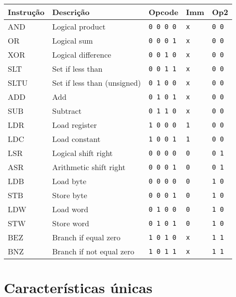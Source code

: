 \documentclass{extreport}
\begin{document}
\begin{table}[ht!]
\centering
\begin{tabular}{|p{2.0cm}|p{5.6cm}|p{1.6cm}|p{1.6cm}|p{1.6cm}|}
\hline
\bf{Instrução} 				& \bf{Descrição} & \bf{Opcode} & \bf{Imm} & \bf{Op2} \\ \hline \hline
AND & Logical product 			& \texttt{0 0 0 0} & \texttt{x} & \texttt{0 0} \\ \hline
OR & Logical sum 			& \texttt{0 0 0 1} & \texttt{x} & \texttt{0 0} \\ \hline
XOR & Logical difference 		& \texttt{0 0 1 0} & \texttt{x} & \texttt{0 0} \\ \hline
SLT & Set if less than 			& \texttt{0 0 1 1} & \texttt{x} & \texttt{0 0} \\ \hline
SLTU & Set if less than (unsigned) 	& \texttt{0 1 0 0} & \texttt{x} & \texttt{0 0} \\ \hline
ADD & Add 				& \texttt{0 1 0 1} & \texttt{x} & \texttt{0 0} \\ \hline
SUB & Subtract 				& \texttt{0 1 1 0} & \texttt{x} & \texttt{0 0} \\ \hline
LDR & Load register 			& \texttt{1 0 0 0} & \texttt{1} & \texttt{0 0} \\ \hline
LDC & Load constant 			& \texttt{1 0 0 1} & \texttt{1} & \texttt{0 0} \\ \hline
LSR & Logical shift right 		& \texttt{0 0 0 0} & \texttt{0} & \texttt{0 1} \\ \hline
ASR & Arithmetic shift right 		& \texttt{0 0 0 1} & \texttt{0} & \texttt{0 1} \\ \hline
LDB & Load byte 			& \texttt{0 0 0 0} & \texttt{0} & \texttt{1 0} \\ \hline
STB & Store byte 			& \texttt{0 0 0 1} & \texttt{0} & \texttt{1 0} \\ \hline
LDW & Load word 			& \texttt{0 1 0 0} & \texttt{0} & \texttt{1 0} \\ \hline
STW & Store word 			& \texttt{0 1 0 1} & \texttt{0} & \texttt{1 0} \\ \hline
BEZ & Branch if equal zero 		& \texttt{1 0 1 0} & \texttt{x} & \texttt{1 1} \\ \hline
BNZ & Branch if not equal zero 		& \texttt{1 0 1 1} & \texttt{x} & \texttt{1 1} \\ \hline
\end{tabular}
\end{table}

\section{Características únicas}
\end{document}
